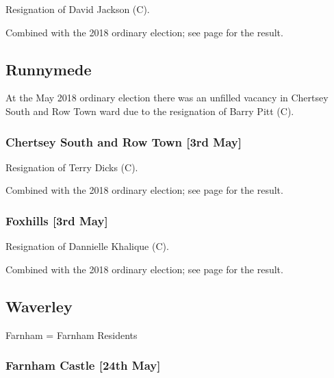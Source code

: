 \documentclass[a4paper,openany]{book}
\begin{document}
\begin{resultsiii}
Resignation of David Jackson (C).

Combined with the 2018 ordinary election; see page \pageref{HorleyWestReigateBanstead} for the result.

\subsection*{Runnymede}

At the May 2018 ordinary election there was an unfilled vacancy in Chertsey South and Row Town ward due to the resignation of Barry Pitt (C).

\subsubsection*{Chertsey South and Row Town \hspace*{\fill}\nolinebreak[1]%
\enspace\hspace*{\fill}
[3rd May]}


Resignation of Terry Dicks (C).

Combined with the 2018 ordinary election; see page \pageref{ChertseySouthRowTownRunnymede} for the result.

\subsubsection*{Foxhills \hspace*{\fill}\nolinebreak[1]%
\enspace\hspace*{\fill}
[3rd May]}


Resignation of Dannielle Khalique (C).

Combined with the 2018 ordinary election; see page \pageref{FoxhillsRunnymede} for the result.

\subsection*{Waverley}

Farnham = Farnham Residents

\subsubsection*{Farnham Castle \hspace*{\fill}\nolinebreak[1]%
\enspace\hspace*{\fill}
[24th May]}


\end{resultsiii}
\end{document}
